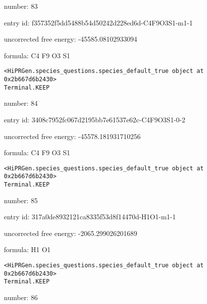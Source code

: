 \documentclass{article}
\begin{document}
number: 83



entry id: f357352f5dd5488b54d50242d228ed6d-C4F9O3S1-m1-1



uncorrected free energy: -45585.08102933094



formula: C4 F9 O3 S1


\vspace{1cm}
\begin{verbatim}
<HiPRGen.species_questions.species_default_true object at 0x2b667d6b2430>
Terminal.KEEP
\end{verbatim}


number: 84



entry id: 3408c7952fc067d2195bb7e61537e62c-C4F9O3S1-0-2



uncorrected free energy: -45578.181931710256



formula: C4 F9 O3 S1


\vspace{1cm}
\begin{verbatim}
<HiPRGen.species_questions.species_default_true object at 0x2b667d6b2430>
Terminal.KEEP
\end{verbatim}


number: 85



entry id: 317a0de8932121ca8335f53d8f14470d-H1O1-m1-1



uncorrected free energy: -2065.299026201689



formula: H1 O1


\vspace{1cm}
\begin{verbatim}
<HiPRGen.species_questions.species_default_true object at 0x2b667d6b2430>
Terminal.KEEP
\end{verbatim}


number: 86
\end{document}
